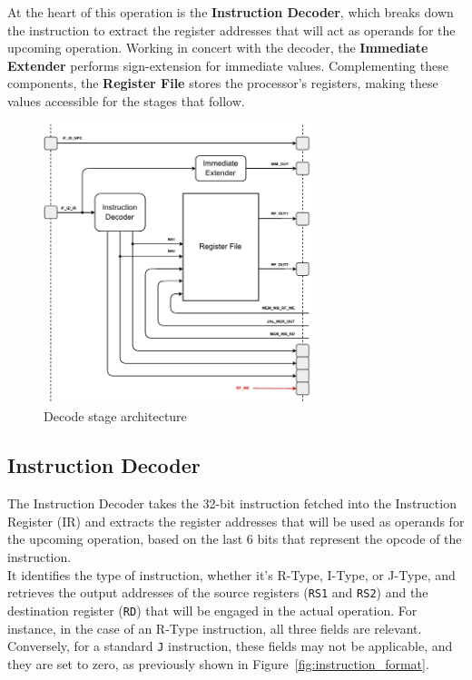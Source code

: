 At the heart of this operation is the \textbf{Instruction Decoder}, which breaks down the instruction to extract the register addresses that will act as operands for the upcoming operation. Working in concert with the decoder, the \textbf{Immediate Extender} performs sign-extension for immediate values. Complementing these components, the \textbf{Register File} stores the processor's registers, making these values accessible for the stages that follow.

\begin{figure}[!htbp]
    \centering
    \includegraphics[width=0.7\textwidth]{source/figures/02_decode.pdf}
    \caption{Decode stage architecture}
    \label{fig:02_decode}
\end{figure}

\subsection{Instruction Decoder}
The Instruction Decoder takes the 32-bit instruction fetched into the Instruction Register (IR) and extracts the register addresses that will be used as operands for the upcoming operation, based on the last 6 bits that represent the opcode of the instruction. \\

It identifies the type of instruction, whether it's R-Type, I-Type, or J-Type, and retrieves the output addresses of the source registers (\texttt{RS1} and \texttt{RS2}) and the destination register (\texttt{RD}) that will be engaged in the actual operation. For instance, in the case of an R-Type instruction, all three fields are relevant. Conversely, for a standard \texttt{J} instruction, these fields may not be applicable, and they are set to zero, as previously shown in Figure~\ref{fig:instruction_format}. \\

